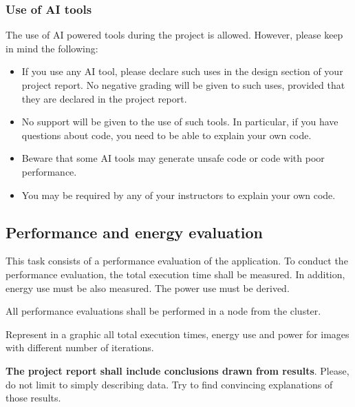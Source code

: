 \subsubsection{Use of AI tools}

The use of AI powered tools during the project is allowed. However, please
keep in mind the following:

\begin{itemize}

\item If you use any AI tool, please declare such uses in the design section
of your project report. No negative grading will be given to such uses, provided
that they are declared in the project report.

\item No support will be given to the use of such tools. In particular, if you
have questions about code, you need to be able to explain your own code.

\item Beware that some AI tools may generate unsafe code or code with poor 
performance.

\item You may be required by any of your instructors to explain your own code.


\end{itemize}

\subsection{Performance and energy evaluation}

This task consists of a performance evaluation of the application.
To conduct the performance evaluation, the total execution time shall be measured.
In addition, energy use must be also measured.
The power use must be derived.

All performance evaluations shall be performed in a node from the
 cluster.

Represent in a graphic all total execution times, energy use and power
for images with different number of iterations.

\textbf{The project report shall include conclusions drawn from results}.
Please, do not limit to simply describing data.
Try to find convincing explanations of those results.

